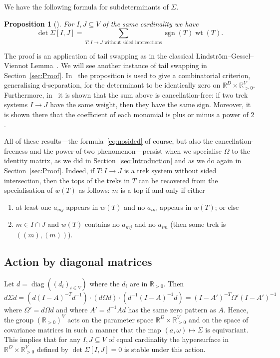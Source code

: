 \documentclass[10pt]{amsart}
\newtheorem{prop}[theo]{Proposition}
\theoremstyle{definition}
\DeclareMathOperator{\sgn}{sgn}
\DeclareMathOperator{\wt}{wt}
\DeclareMathOperator{\diag}{diag}
\newcommand{\RR}{\mathbb{R}}
\begin{document}
We have the following formula for subdeterminants of $\Sigma$.

\begin{prop}[\cite{Draisma09d}]
For $I,J \subseteq V$ of the same cardinality we have
\begin{equation}
\det \Sigma[I,J]=\sum_{T:I \to J \text{ without sided
intersections}} \sgn(T) \wt(T). \label{eq:nosided}
\tag{$\ast$}
\end{equation}
\end{prop}

The proof is an application of tail swapping as in the classical Lindstr\"om--Gessel--Viennot Lemma~\cite{Gessel85}. We will see another instance of tail swapping in Section~\ref{sec:Proof}. In~\cite{Draisma09d} the proposition is used to give a combinatorial criterion, generalising d-sepa\-ra\-tion, for the determinant to be identically zero on $\RR^D \times \RR_{>0}^V$. Furthermore, in~\cite{Draisma12h} it is shown that the sum above is cancellation-free: if two trek systems $I \to J$ have the same weight, then they have the same sign. Moreover, it is shown there that the coefficient of each monomial is plus or minus a power of $2$.

All of these results---the formula~\eqref{eq:nosided} of course, but also the cancellation-freeness and the power-of-two phenomenon---persist when we specialise $\Omega$ to the identity matrix, as we did in Section~\ref{sec:Introduction} and as we do again in Section~\ref{sec:Proof}. Indeed, if $T: I \to J$ is a trek system without sided intersection, then the tops of the treks in $T$ can be recovered from the specialisation of $w(T)$ as follows: $m$ is a top if and only if either
\begin{enumerate}
\item at least one $a_{mj}$ appears in $w(T)$ and no $a_{im}$ appears in $w(T)$; or else
\item $m \in I \cap J$ and $w(T)$ contains no $a_{mj}$ and no $a_{im}$ (then some trek is $((m),(m))$).
\end{enumerate}

\subsection*{Action by diagonal matrices}

Let $d=\diag((d_i)_{i \in V})$ where the $d_i$ are in $\RR_{>0}$. Then
\[
d \Sigma d= (d(I-A)^{-T}d^{-1}) \cdot (d \Omega d) \cdot (d^{-1}(I-A)^{-1}d)= (I-A')^{-T} \Omega' (I-A')^{-1}
\]
where $\Omega'=d \Omega d$ and where $A'=d^{-1}Ad$ has the same zero pattern as $A$. Hence, the group $(\RR_{>0})^V$ acts on the parameter space $\RR^D \times \RR_{>0}^V$ and on the space of covariance matrices in such a manner that the map $(a,\omega) \mapsto \Sigma$ is equivariant. This implies that for any $I, J \subseteq V$ of equal cardinality the hypersurface in $\RR^D \times \RR_{>0}^V$ defined by $\det \Sigma[I,J]=0$ is stable under this action.
\end{document}
